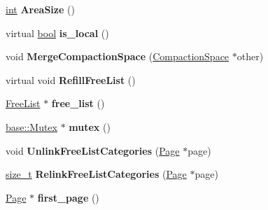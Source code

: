 \begin{DoxyCompactItemize}
\mbox{\hyperlink{classint}{int}} {\bfseries Area\+Size} ()
\item 
\mbox{\label{classv8_1_1internal_1_1PagedSpace_afb305bd5b7becd7c672294ee34cd4649}} 
virtual \mbox{\hyperlink{classbool}{bool}} {\bfseries is\+\_\+local} ()
\item 
\mbox{\label{classv8_1_1internal_1_1PagedSpace_a07c8e12295961020e9fda32ae29204d4}} 
void {\bfseries Merge\+Compaction\+Space} (\mbox{\hyperlink{classv8_1_1internal_1_1CompactionSpace}{Compaction\+Space}} $\ast$other)
\item 
\mbox{\label{classv8_1_1internal_1_1PagedSpace_ab1006806cc0cd72589fa3dfad5892432}} 
virtual void {\bfseries Refill\+Free\+List} ()
\item 
\mbox{\label{classv8_1_1internal_1_1PagedSpace_ae33395cb348529b779ca8afd5d548747}} 
\mbox{\hyperlink{classv8_1_1internal_1_1FreeList}{Free\+List}} $\ast$ {\bfseries free\+\_\+list} ()
\item 
\mbox{\label{classv8_1_1internal_1_1PagedSpace_a853f1a10c66848593987d2d39cbdc18c}} 
\mbox{\hyperlink{classv8_1_1base_1_1Mutex}{base\+::\+Mutex}} $\ast$ {\bfseries mutex} ()
\item 
\mbox{\label{classv8_1_1internal_1_1PagedSpace_adf9e3e161534bdb4d8db7a404850d7d8}} 
void {\bfseries Unlink\+Free\+List\+Categories} (\mbox{\hyperlink{classv8_1_1internal_1_1Page}{Page}} $\ast$page)
\item 
\mbox{\label{classv8_1_1internal_1_1PagedSpace_a3d44ca37bd5926b1a807f7624d403841}} 
\mbox{\hyperlink{classsize__t}{size\+\_\+t}} {\bfseries Relink\+Free\+List\+Categories} (\mbox{\hyperlink{classv8_1_1internal_1_1Page}{Page}} $\ast$page)
\item 
\mbox{\label{classv8_1_1internal_1_1PagedSpace_a6214bc07c7fb4195d7d3517e9c605596}} 
\mbox{\hyperlink{classv8_1_1internal_1_1Page}{Page}} $\ast$ {\bfseries first\+\_\+page} ()
\item 

\end{DoxyCompactItemize}
